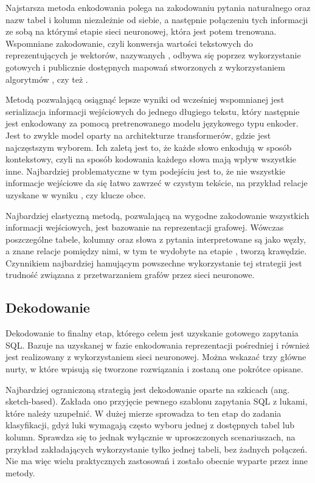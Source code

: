 Najstarsza metoda enkodowania polega na zakodowaniu pytania naturalnego oraz nazw tabel i kolumn niezależnie od siebie, a następnie połączeniu tych informacji ze sobą na którymś etapie sieci neuronowej, która jest potem trenowana. Wspomniane zakodowanie, czyli konwersja wartości tekstowych do reprezentujących je wektorów, nazywanych , odbywa się poprzez wykorzystanie gotowych i publicznie dostępnych mapowań stworzonych z wykorzystaniem algorytmów , czy też .

Metodą pozwalającą osiągnąć lepsze wyniki od wcześniej wspomnianej jest serializacja informacji wejściowych do jednego długiego tekstu, który następnie jest enkodowany za pomocą pretrenowanego modelu językowego typu enkoder. Jest to zwykle model oparty na architekturze transformerów, gdzie  jest najczęstszym wyborem. Ich zaletą jest to, że każde słowo enkodują w sposób kontekstowy, czyli na sposób kodowania każdego słowa mają wpływ wszystkie inne. Najbardziej problematyczne w tym podejściu jest to, że nie wszystkie informacje wejściowe da się łatwo zawrzeć w czystym tekście, na przykład relacje uzyskane w wyniku , czy klucze obce.

Najbardziej elastyczną metodą, pozwalającą na wygodne zakodowanie wszystkich informacji wejściowych, jest bazowanie na reprezentacji grafowej. Wówczas poszczególne tabele, kolumny oraz słowa z pytania interpretowane są jako węzły, a znane relacje pomiędzy nimi, w tym te wydobyte na etapie , tworzą krawędzie. Czynnikiem najbardziej hamującym powszechne wykorzystanie tej strategii jest trudność związana z przetwarzaniem grafów przez sieci neuronowe. 

\subsection{Dekodowanie}
Dekodowanie to finalny etap, którego celem jest uzyskanie gotowego zapytania SQL. Bazuje na uzyskanej w fazie enkodowania reprezentacji pośredniej i również jest realizowany z wykorzystaniem sieci neuronowej. Można wskazać trzy główne nurty, w które wpisują się tworzone rozwiązania i zostaną one pokrótce opisane.

Najbardziej ograniczoną strategią jest dekodowanie oparte na szkicach (ang. sketch-based). Zakłada ono przyjęcie pewnego szablonu zapytania SQL z lukami, które należy uzupełnić. W dużej mierze sprowadza to ten etap do zadania klasyfikacji, gdyż luki wymagają często wyboru jednej z dostępnych tabel lub kolumn.  Sprawdza się to jednak wyłącznie w uproszczonych scenariuszach, na przykład zakładających wykorzystanie tylko jednej tabeli, bez żadnych połączeń. Nie ma więc wielu praktycznych zastosowań i zostało obecnie wyparte przez inne metody. 

